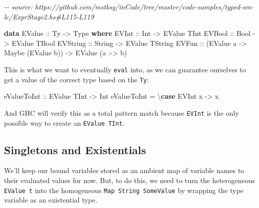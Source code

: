 \documentclass[]{article}
\newenvironment{Shaded}{}{}
\newcommand{\CommentTok}[1]{\textcolor[rgb]{0.38,0.63,0.69}{\textit{#1}}}
\newcommand{\DataTypeTok}[1]{\textcolor[rgb]{0.56,0.13,0.00}{#1}}
\newcommand{\KeywordTok}[1]{\textcolor[rgb]{0.00,0.44,0.13}{\textbf{#1}}}
\newcommand{\NormalTok}[1]{#1}
\newcommand{\OperatorTok}[1]{\textcolor[rgb]{0.40,0.40,0.40}{#1}}
\newcommand{\OtherTok}[1]{\textcolor[rgb]{0.00,0.44,0.13}{#1}}
\begin{document}
\begin{Shaded}
\begin{Highlighting}[]
\CommentTok{{-}{-} source: https://github.com/mstksg/inCode/tree/master/code{-}samples/typed{-}sm{-}lc/ExprStage2.hs\#L115{-}L119}

\KeywordTok{data} \DataTypeTok{EValue}\OtherTok{ ::} \DataTypeTok{Ty} \OtherTok{{-}\textgreater{}} \DataTypeTok{Type} \KeywordTok{where}
  \DataTypeTok{EVInt}\OtherTok{ ::} \DataTypeTok{Int} \OtherTok{{-}\textgreater{}} \DataTypeTok{EValue} \DataTypeTok{TInt}
  \DataTypeTok{EVBool}\OtherTok{ ::} \DataTypeTok{Bool} \OtherTok{{-}\textgreater{}} \DataTypeTok{EValue} \DataTypeTok{TBool}
  \DataTypeTok{EVString}\OtherTok{ ::} \DataTypeTok{String} \OtherTok{{-}\textgreater{}} \DataTypeTok{EValue} \DataTypeTok{TString}
  \DataTypeTok{EVFun}\OtherTok{ ::}\NormalTok{ (}\DataTypeTok{EValue}\NormalTok{ a }\OtherTok{{-}\textgreater{}} \DataTypeTok{Maybe}\NormalTok{ (}\DataTypeTok{EValue}\NormalTok{ b)) }\OtherTok{{-}\textgreater{}} \DataTypeTok{EValue}\NormalTok{ (a }\OperatorTok{:{-}\textgreater{}}\NormalTok{ b)}
\end{Highlighting}
\end{Shaded}

This is what we want to eventually \texttt{eval} into, as we can guarantee
ourselves to get a value of the correct type based on the \texttt{Ty}:

\begin{Shaded}
\begin{Highlighting}[]
\OtherTok{eValueToInt ::} \DataTypeTok{EValue} \DataTypeTok{TInt} \OtherTok{{-}\textgreater{}} \DataTypeTok{Int}
\NormalTok{eValueToInt }\OtherTok{=}\NormalTok{ \textbackslash{}}\KeywordTok{case}
    \DataTypeTok{EVInt}\NormalTok{ x }\OtherTok{{-}\textgreater{}}\NormalTok{ x}
\end{Highlighting}
\end{Shaded}

And GHC will verify this as a total pattern match because \texttt{EVInt} is the
only possible way to create an \texttt{EValue\ TInt}.

\subsection{Singletons and Existentials}\label{singletons-and-existentials}

We'll keep our bound variables stored as an ambient map of variable names to
their evaluated values for now. But, to do this, we need to turn the
heterogeneous \texttt{EValue\ t} into the homogeneous
\texttt{Map\ String\ SomeValue} by wrapping the type variable as an existential
type.
\end{document}
